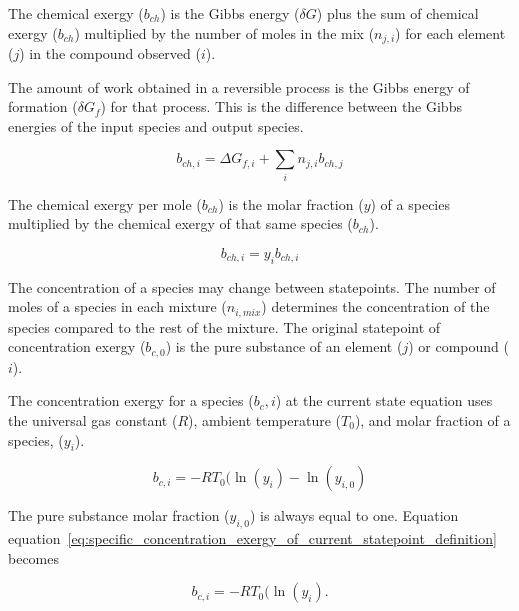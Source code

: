 \documentclass[energies,article,submit,pdftex,moreauthors]{Definitions/mdpi}
\begin{document}
The chemical exergy ($b_{ch}$) is the Gibbs energy ($\delta{G}$)
plus the sum of chemical exergy ($b_{ch}$)
multiplied by the number of moles
in the mix ($n_{j,i}$) for each element ($j$)
in the compound observed ($i$).

The amount of work obtained
in a reversible process is the Gibbs energy
of formation ($\delta{G_{f}}$) for that process.
This is the difference between the Gibbs energies
of the input species and output species.

\begin{equation}\label{eq:specific_chemical_exergy_definition}
  b_{ch,i} = \Delta{G_{f,i}} + \sum_{i}{n_{j,i}b_{ch,j}}
\end{equation}

The chemical exergy per mole ($b_{ch}$) is the molar fraction ($y$)
of a species multiplied by the chemical exergy of that same species ($b_{ch}$).

\begin{equation}\label{eq:chemical_exergy_state_point1}
  b_{ch,i} = y_{i}b_{ch,i}
\end{equation}

The concentration of a species
may change between statepoints.
The number of moles of a species in each mixture ($n_{i,mix}$)
determines the concentration of the species
compared to the rest of the mixture.
The original statepoint of concentration exergy ($b_{c,0}$) is the pure substance
of an element ($j$) or compound ($i$).

The concentration exergy for a species ($b_c,i$)
at the current state
equation uses the universal gas constant ($R$),
ambient temperature ($T_0$),
and molar fraction of a species, ($y_i$).

\begin{equation}\label{eq:specific_concentration_exergy_of_current_statepoint_definition}
  b_{c,i} = -RT_{0}(\ln(y_{i}) - \ln(y_{i,0})
\end{equation}

The pure substance molar fraction ($y_{i,0}$) is always equal to one.
Equation equation~\ref{eq:specific_concentration_exergy_of_current_statepoint_definition} becomes

\begin{equation}\label{eq:specific_concentration_exergy_of_current_statepoint_definition}
  b_{c,i} = -RT_{0}(\ln(y_{i}).
\end{equation}
\end{document}
